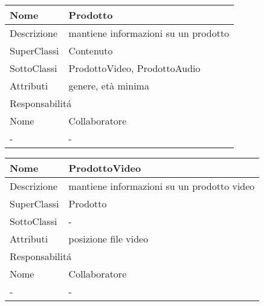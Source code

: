 \begin{center} %
    \begin{longtable}{ |p{3cm}|p{3cm}|p{3cm}|p{3cm}| }
        \hline
        Nome & \multicolumn{3}{|p{9cm}|}{Prodotto} \\\hline
        Descrizione & \multicolumn{3}{|p{9cm}|}{mantiene informazioni su un prodotto} \\\hline
        SuperClassi & \multicolumn{3}{|p{9cm}|}{Contenuto} \\\hline
        SottoClassi & \multicolumn{3}{|p{9cm}|}{ProdottoVideo, ProdottoAudio} \\\hline
        Attributi & \multicolumn{3}{|p{9cm}|}{genere, età minima} \\\hline
        \multicolumn{4}{|p{12cm}|}{Responsabilit\'a} \\\hline %
        \multicolumn{2}{|p{6cm}|}{Nome} & \multicolumn{2}{|p{6cm}|}{Collaboratore} \\\hline
        \multicolumn{2}{|p{6cm}|}{-} & \multicolumn{2}{|p{6cm}|}{-} \\\hline
    \end{longtable}
\end{center}


\begin{center} %
    \begin{longtable}{ |p{3cm}|p{3cm}|p{3cm}|p{3cm}| }
        \hline
        Nome & \multicolumn{3}{|p{9cm}|}{ProdottoVideo} \\\hline
        Descrizione & \multicolumn{3}{|p{9cm}|}{mantiene informazioni su un prodotto video} \\\hline
        SuperClassi & \multicolumn{3}{|p{9cm}|}{Prodotto} \\\hline
        SottoClassi & \multicolumn{3}{|p{9cm}|}{-} \\\hline
        Attributi & \multicolumn{3}{|p{9cm}|}{posizione file video} \\\hline
        \multicolumn{4}{|p{12cm}|}{Responsabilit\'a} \\\hline %
        \multicolumn{2}{|p{6cm}|}{Nome} & \multicolumn{2}{|p{6cm}|}{Collaboratore} \\\hline
        \multicolumn{2}{|p{6cm}|}{-} & \multicolumn{2}{|p{6cm}|}{-} \\\hline
    \end{longtable}
\end{center}

